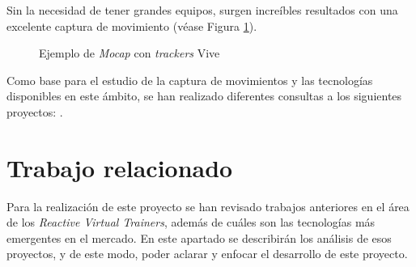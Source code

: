 Sin la necesidad de tener grandes equipos, surgen increíbles resultados con una excelente captura de movimiento (véase Figura \ref{fig:ViveMocap}).

\begin{figure}[h!]
    \centering
    \caption{Ejemplo de \textit{Mocap} con \textit{trackers} Vive}
    \label{fig:ViveMocap}  
\end{figure}


Como base para el estudio de la captura de movimientos y las tecnologías disponibles en este ámbito, se han realizado diferentes consultas a los siguientes proyectos: \cite{ Menendez2015} \cite{ Mejias2014} \cite{VIC}.

\section{Trabajo relacionado}

Para la realización de este proyecto se han revisado trabajos anteriores en el área de los \textit{Reactive Virtual Trainers}, además de cuáles son las tecnologías más emergentes en el mercado. En este apartado se describirán los análisis de esos proyectos, y de este modo, poder aclarar y enfocar el desarrollo de este proyecto.


